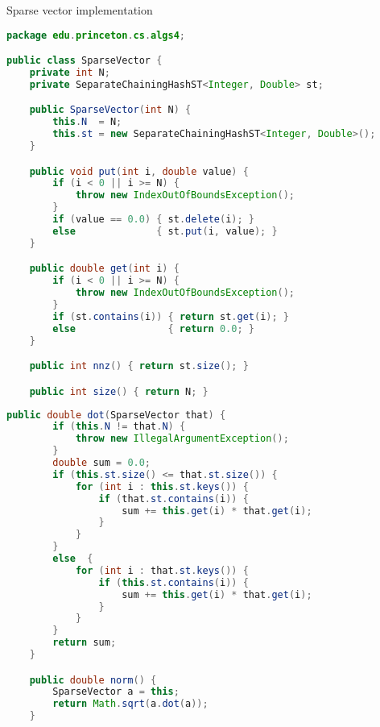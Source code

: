 \documentclass[8pt,a4paper,compress]{beamer}
\begin{document}
\begin{frame}[fragile]
\pause

Sparse vector implementation
\begin{lstlisting}[language=Java]
package edu.princeton.cs.algs4;

public class SparseVector {
    private int N; 
    private SeparateChainingHashST<Integer, Double> st; 

    public SparseVector(int N) {
        this.N  = N;
        this.st = new SeparateChainingHashST<Integer, Double>();
    }

    public void put(int i, double value) {
        if (i < 0 || i >= N) {
            throw new IndexOutOfBoundsException();
        }
        if (value == 0.0) { st.delete(i); }
        else              { st.put(i, value); }
    }

    public double get(int i) {
        if (i < 0 || i >= N) { 
            throw new IndexOutOfBoundsException();
        }
        if (st.contains(i)) { return st.get(i); }
        else                { return 0.0; }
    }

    public int nnz() { return st.size(); }

    public int size() { return N; }
\end{lstlisting}
\end{frame}

\begin{frame}[fragile]
\pause

\begin{lstlisting}[language=Java]
    public double dot(SparseVector that) {
        if (this.N != that.N) {
            throw new IllegalArgumentException();
        }
        double sum = 0.0;
        if (this.st.size() <= that.st.size()) {
            for (int i : this.st.keys()) {
                if (that.st.contains(i)) { 
                    sum += this.get(i) * that.get(i); 
                }
            }
        }
        else  {
            for (int i : that.st.keys()) {
                if (this.st.contains(i)) {
                    sum += this.get(i) * that.get(i);
                }
            }
        }
        return sum;
    }

    public double norm() {
        SparseVector a = this;
        return Math.sqrt(a.dot(a));
    }
\end{lstlisting}
\end{frame}
\end{document}
